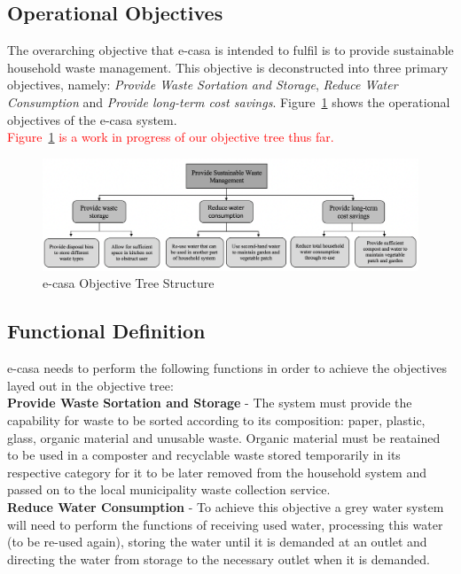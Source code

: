 \documentclass[a4paper,11pt,fleqn]{report}
\begin{document}
\subsection{Operational Objectives}
The overarching objective that \ac{e-casa} is intended to fulfil is to provide sustainable household waste management. This objective is deconstructed into three primary objectives, namely: \textit{Provide Waste Sortation and Storage}, \textit{Reduce Water Consumption} and \textit{Provide long-term cost savings}. Figure~\ref{fig: ecasaOT} shows the operational objectives of the \ac{e-casa} system.\\

\textcolor{red}{Figure~\ref{fig: ecasaOT} is a work in progress of our objective tree thus far.}

\begin{figure}[h!]
\begin{center}
\includegraphics[scale = 0.55]{ecasa_OT.png}
\caption{e-casa Objective Tree Structure}
\label{fig: ecasaOT}
\end{center}
\end{figure}

\subsection{Functional Definition}
\ac{e-casa} needs to perform the following functions in order to achieve the objectives layed out in the objective tree:\\

\noindent\textbf{Provide Waste Sortation and Storage} - The system must provide the capability for waste to be sorted according to its composition: paper, plastic, glass, organic material and unusable waste. Organic material must be reatained to be used in a composter and recyclable waste stored temporarily in its respective category for it to be later removed from the household system and passed on to the local municipality waste collection service.\\

\noindent\textbf{Reduce Water Consumption} - To achieve this objective a grey water system will need to perform the functions of receiving used water, processing this water (to be re-used again), storing the water until it is demanded at an outlet and directing the water from storage to the necessary outlet when it is demanded.\\
\end{document}
